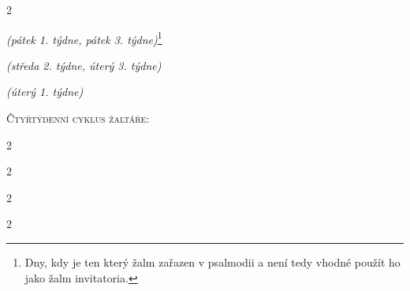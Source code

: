\documentclass[a5paper, twoside]{article}
\newenvironment{hora}{
  \begin{multicols}{2}
}{
  \end{multicols}
}
\begin{document}
\begin{hora}
\label{zalm95}




{\footnotesize \noindent \textit{(pátek 1. týdne, pátek 3. týdne)}\footnote{
Dny, kdy je ten který žalm zařazen v psalmodii a není tedy vhodné použít ho
jako žalm invitatoria.}}



{\footnotesize \noindent \textit{(středa 2. týdne, úterý 3. týdne)}}



{\footnotesize \noindent \textit{(úterý 1. týdne)}}

\end{hora}

\clearpage

\begin{center}
{\LARGE \textsc{Čtyřtýdenní cyklus žaltáře:}}
\end{center}



\nesporyI
\begin{hora}


\label{kantfp2}

\end{hora}

\ranniChvaly
\begin{hora}
\label{zalmyne1trch}



\end{hora}

\modlitbaUprostredDne
\begin{hora}
\label{z118i}

\label{z118ii}

\label{z118iii}

\end{hora}

\nesporyII
\begin{hora}
\label{z110}

\label{z114}


\vspace{10mm}
\noindent{}
\label{kantzj19}


\vspace{3mm}
\noindent{}
\label{kant1petr2}

\end{hora}
\end{document}
